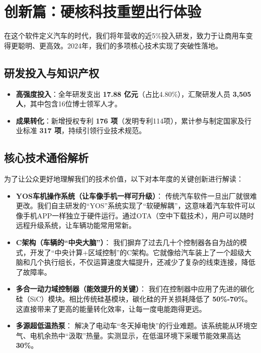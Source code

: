 \documentclass[a4paper,12pt]{article}
\begin{document}
\section{创新篇：硬核科技重塑出行体验}

在这个软件定义汽车的时代，我们将年营收的近5\%投入研发，致力于让商用车变得更聪明、更高效。2024年，我们的多项核心技术实现了突破性落地。

\subsection{研发投入与知识产权}
\begin{itemize}
    \item \textbf{高强度投入}：全年研发支出 \textbf{17.88 亿元}（占比4.80\%），汇聚研发人员 \textbf{3,505 人}，其中包含16位博士领军人才。
    \item \textbf{成果转化}：新增授权专利 \textbf{176 项}（发明专利114项），累计参与制定国家及行业标准 \textbf{317 项}，持续引领行业技术规范。
\end{itemize}

\subsection{核心技术通俗解析}
为了让公众更好地理解我们的技术价值，以下对本年度的关键创新进行解读：

\begin{itemize}
    \item \textbf{YOS车机操作系统（让车像手机一样可升级）}：
    传统汽车软件一旦出厂就很难更改。我们自主研发的“YOS”系统实现了“软硬解耦”，这意味着汽车软件可以像手机APP一样独立于硬件运行。通过OTA（空中下载技术），用户可以随时远程升级系统，让车辆功能常用常新。
    
    \item \textbf{C架构（车辆的“中央大脑”）}：
    我们摒弃了过去几十个控制器各自为战的模式，开发了“中央计算+区域控制”的C架构。它就像给汽车装上了一个超级大脑和几个执行组长，不仅运算速度大幅提升，还减少了复杂的线束连接，降低了故障率。
    
    \item \textbf{多合一动力域控制器（能效提升的关键）}：
    我们在控制器中应用了先进的碳化硅（SiC）模块。相比传统硅基模块，碳化硅的开关损耗降低了 \textbf{50\%-70\%}。这直接带来了更高的能量转化效率，让每一度电能跑得更远。
    
    \item \textbf{多源超低温热泵}：
    解决了电动车“冬天掉电快”的行业难题。该系统能从环境空气、电机余热中“汲取”热量。实测显示，在低温环境下采暖节能效果高达 \textbf{30\%}。
\end{itemize}
\end{document}
